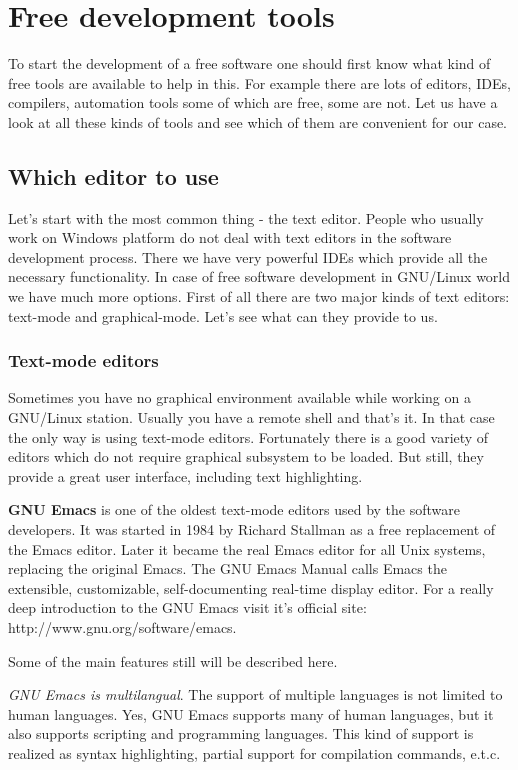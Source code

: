 
\chapter{Free development tools}
To start the development of a free software one should first know what kind of free tools are available to help in this. For example there are lots of editors, IDEs, compilers, automation tools some of which are free, some are not. Let us have a look at all these kinds of tools and see which of them are convenient for our case.

\section{Which editor to use}
\label{editor}
Let's  start with the most common thing - the text editor. People who usually work on Windows platform do not deal with text editors in the software development process. There we have very powerful IDEs which provide all the necessary functionality. In case of free software development in GNU/Linux world we have much more options. First of all there are two major kinds of text editors: text-mode and graphical-mode. Let's see what can they provide to us.

\subsection{Text-mode editors}
Sometimes you have no graphical environment available while working on a GNU/Linux station. Usually you have a remote shell and that's it. In that case the only way is using text-mode editors. Fortunately there is a good variety of editors which do not require graphical subsystem to be loaded. But still, they provide a great user interface, including text highlighting.

\textbf {GNU Emacs} is one of the oldest text-mode editors used by the software developers. It was started in 1984 by Richard Stallman as a free replacement of the Emacs editor. Later it became the real Emacs editor for all Unix systems, replacing the original Emacs. The GNU Emacs Manual calls Emacs the extensible, customizable, self-documenting real-time display editor. For a really deep introduction to the GNU Emacs visit it's official site: http://www.gnu.org/software/emacs.

Some of the main features still will be described here. 

\textit {GNU Emacs is multilangual}. The support of multiple languages is not limited to human languages. Yes, GNU Emacs supports many of human languages, but it also supports scripting and programming languages. This kind of support is realized as syntax highlighting, partial support for compilation commands, e.t.c.

